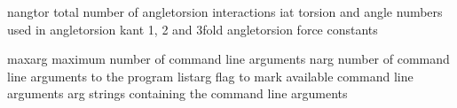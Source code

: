\documentclass[letterpaper,11pt,english]{sphinxmanual}
\begin{document}
\sphinxAtStartPar
{}

\begin{sphinxVerbatim}[commandchars=\\\{\}]
nangtor         total number of angle\PYGZhy{}torsion interactions
iat             torsion and angle numbers used in angle\PYGZhy{}torsion
kant            1\PYGZhy{}, 2\PYGZhy{} and 3\PYGZhy{}fold angle\PYGZhy{}torsion force constants
\end{sphinxVerbatim}

\sphinxAtStartPar
{}

\begin{sphinxVerbatim}[commandchars=\\\{\}]
maxarg          maximum number of command line arguments
narg            number of command line arguments to the program
listarg         flag to mark available command line arguments
arg             strings containing the command line arguments
\end{sphinxVerbatim}

\sphinxAtStartPar
{}
\end{document}
